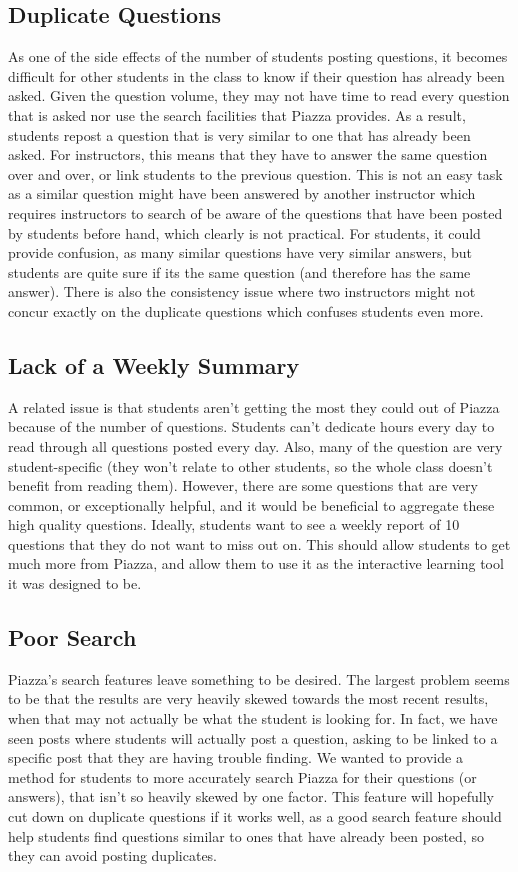 \documentclass[sigconf]{acmart}
\begin{document}
\subsection{Duplicate Questions}
As one of the side effects of the number of students posting questions, it becomes difficult for other students in the class to know if their question has already been asked. Given the question volume, they may not have time to read every question that is asked nor use the search facilities that Piazza provides. As a result, students repost a question that is very similar to one that has already been asked. For instructors, this means that they have to answer the same question over and over, or link students to the previous question. This is not an easy task as a similar question might have been answered by another instructor which requires instructors to search of be aware of the questions that have been posted by students before hand, which clearly is not practical. For students, it could provide confusion, as many similar questions have very similar answers, but students are quite sure if its the same question (and therefore has the same answer). There is also the consistency issue where two instructors might not concur exactly on the duplicate questions which confuses students even more.

\subsection{Lack of a Weekly Summary}
A related issue is that students aren't getting the most they could out of Piazza because of the number of questions. Students can't dedicate hours every day to read through all questions posted every day. Also, many of the question are very student-specific (they won't relate to other students, so the whole class doesn't benefit from reading them). However, there are some questions that are very common, or exceptionally helpful, and it would be beneficial to aggregate these high quality questions. Ideally, students want to see a weekly report of 10 questions that they do not want to miss out on. This should allow students to get much more from Piazza, and allow them to use it as the interactive learning tool it was designed to be.

\subsection{Poor Search}
Piazza's search features leave something to be desired. The largest problem seems to be that the results are very heavily skewed towards the most recent results, when that may not actually be what the student is looking for. In fact, we have seen posts where students will actually post a question, asking to be linked to a specific post that they are having trouble finding. We wanted to provide a method for students to more accurately search Piazza for their questions (or answers), that isn't so heavily skewed by one factor. This feature will hopefully cut down on duplicate questions if it works well, as a good search feature should help students find questions similar to ones that have already been posted, so they can avoid posting duplicates.
\end{document}
